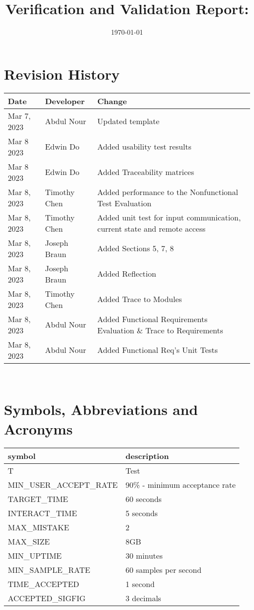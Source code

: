 \documentclass[12pt, titlepage]{article}
\begin{document}
\title{Verification and Validation Report: \progname} 
\author{\authname}
\date{\today}
	
\maketitle


\section{Revision History}


\begin{tabularx}{\textwidth}{p{3cm}p{3cm}X}
\toprule {\bf Date} & {\bf Developer} & {\bf Change}\\
\midrule
Mar 7, 2023 & Abdul Nour & Updated template\\
Mar 8 2023 & Edwin Do & Added usability test results \\
Mar 8 2023 & Edwin Do & Added Traceability matrices \\
Mar 8, 2023 & Timothy Chen & Added performance to the Nonfunctional Test Evaluation\\
Mar 8, 2023 & Timothy Chen & Added unit test for input communication, current state and remote access\\
Mar 8, 2023 & Joseph Braun & Added Sections 5, 7, 8 \\
Mar 8, 2023 & Joseph Braun & Added Reflection \\
Mar 8, 2023 & Timothy Chen & Added Trace to Modules \\
Mar 8, 2023 & Abdul Nour & Added Functional Requirements Evaluation \& Trace to Requirements\\
Mar 8, 2023 & Abdul Nour & Added Functional Req's Unit Tests\\
\bottomrule
\end{tabularx}

~\newpage

\section{Symbols, Abbreviations and Acronyms}

\renewcommand{\arraystretch}{1.2}
\begin{tabular}{l l} 
  \toprule		
  \textbf{symbol} & \textbf{description}\\
  \midrule 
  T & Test\\
  MIN\_USER\_ACCEPT\_RATE & 90\% - minimum acceptance rate\\
  TARGET\_TIME & 60 seconds \\
  INTERACT\_TIME & 5 seconds \\
  MAX\_MISTAKE & 2 \\
  MAX\_SIZE & 8GB \\ 
  MIN\_UPTIME & 30 minutes \\ 
  MIN\_SAMPLE\_RATE & 60 samples per second\\
  TIME\_ACCEPTED & 1 second \\
  ACCEPTED\_SIGFIG & 3 decimals \\
  \bottomrule
\end{tabular}\\
\end{document}
